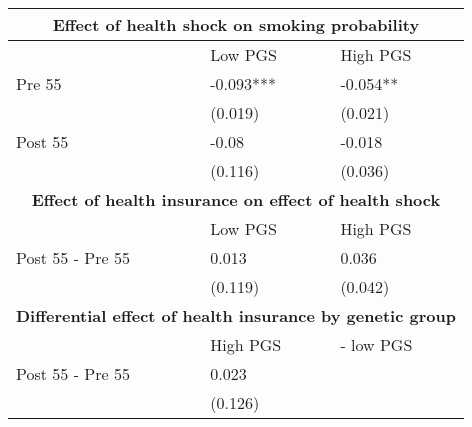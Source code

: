 % 
\begin{tabular}{lll}
  \toprule
  \multicolumn{3}{c}{ \textbf{Effect of health shock on smoking probability}} \\
 \midrule
 & Low PGS & High PGS \\ 
   \midrule
Pre 55 & -0.093*** & -0.054** \\ 
   & (0.019) & (0.021) \\ 
  Post 55 & -0.08 & -0.018 \\ 
   & (0.116) & (0.036) \\ 
   \toprule \multicolumn{3}{c}{ \textbf{Effect of health insurance on effect of health shock}} \\
 \midrule
 & Low PGS & High PGS \\ 
   \midrule
Post 55 - Pre 55 & 0.013 & 0.036 \\ 
   & (0.119) & (0.042) \\ 
   \toprule \multicolumn{3}{c}{ \textbf{Differential effect of health insurance by genetic group}} \\
 \midrule
 & High PGS  & - low PGS \\ 
   \midrule
Post 55 - Pre 55 & 0.023 &  \\ 
   & (0.126) &  \\ 
   \bottomrule
\end{tabular}
